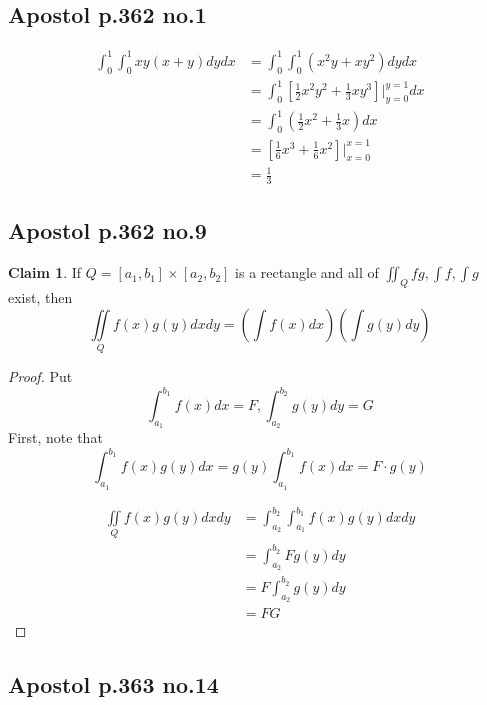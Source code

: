 \documentclass[12pt,letterpaper]{article}
\theoremstyle{definition}
\newtheorem*{claim}{Claim}
\begin{document}
\subsection*{Apostol p.362 no.1}

\begin{align*}
  \int_0^1\int_0^1xy(x+y)dydx &= \int_0^1\int_0^1(x^2y + xy^2)dydx \\
                              &= \int_0^1\left[ \frac{1}{2}x^2y^2 + \frac{1}{3}xy^3 \right]\Big|_{y=0}^{y=1}dx \\
                              &= \int_0^1 (\frac{1}{2}x^2 + \frac{1}{3}x)dx \\
                              &= \left[ \frac{1}{6}{x^3 + \frac{1}{6}x^2} \right]\Big|_{x=0}^{x=1} \\
                              &= \frac{1}{3}
\end{align*}

\subsection*{Apostol p.362 no.9}

\begin{claim}
  If $Q = [a_1,b_1] \times [a_2,b_2]$ is a rectangle and all of $\iint_Q fg,
  \int f, \int g$ exist, then
  \[
    \iint\limits_Q f(x)g(y)dxdy = \left( \int f(x)dx \right)\left( \int g(y)dy \right)
  \]
\end{claim}

\begin{proof}
  Put 
  \[
    \int_{a_1}^{b_1}f(x)dx = F, \int_{a_2}^{b_2}g(y)dy = G
  \]
  First, note that
  \[
    \int_{a_1}^{b_1}f(x)g(y)dx = g(y)\int_{a_1}^{b_1}f(x)dx = F \cdot g(y)
  \]
  
  \begin{align*}
    \iint\limits_Q f(x)g(y)dxdy &= \int_{a_2}^{b_2}\int_{a_1}^{b_1}f(x)g(y)dxdy \\
                                &= \int_{a_2}^{b_2} Fg(y)dy \\
                                &= F\int_{a_2}^{b_2}g(y)dy \\
                                &= FG
  \end{align*}
\end{proof}

\subsection*{Apostol p.363 no.14}
\end{document}
